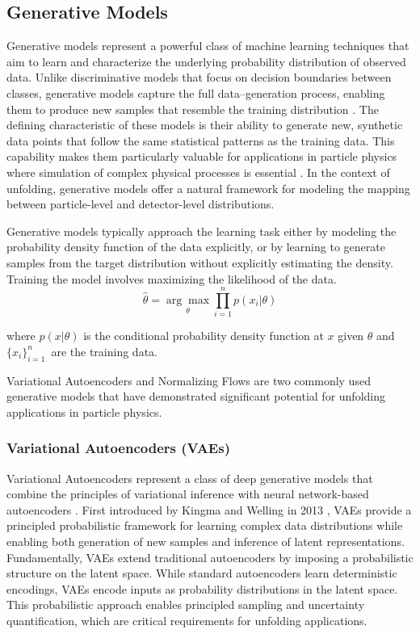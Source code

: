 \subsection{Generative Models}
    Generative models represent a powerful class of machine learning techniques that aim to learn and characterize the underlying probability distribution of observed data.
    Unlike discriminative models that focus on decision boundaries between classes, generative models capture the full data--generation process, enabling them to produce new samples that resemble the training distribution .
    The defining characteristic of these models is their ability to generate new, synthetic data points that follow the same statistical patterns as the training data.
    This capability makes them particularly valuable for applications in particle physics where simulation of complex physical processes is essential .
    In the context of unfolding, generative models offer a natural framework for modeling the mapping between particle-level and detector-level distributions.
    
    Generative models typically approach the learning task either by modeling the probability density function of the data explicitly, or by learning to generate samples from the target distribution without explicitly estimating the density.
    Training the model involves maximizing the likelihood of the data.
    \begin{equation}
        \hat{\theta} = \underset{\theta}{\arg\max} \prod_{i=1}^{n} p(x_i | \theta)
    \end{equation}
    
    where \(p(x | \theta)\) is the conditional probability density function at \(x\) given \(\theta\) and \(\{x_i\}_{i=1}^{n}\)\ are the training data.
    
    Variational Autoencoders and Normalizing Flows are two commonly used generative models that have demonstrated significant potential for unfolding applications in particle physics.

    \subsubsection{Variational Autoencoders (VAEs)}
        Variational Autoencoders represent a class of deep generative models that combine the principles of variational inference with neural network-based autoencoders .
        First introduced by Kingma and Welling in 2013 , VAEs provide a principled probabilistic framework for learning complex data distributions while enabling both generation of new samples and inference of latent representations.
        Fundamentally, VAEs extend traditional autoencoders by imposing a probabilistic structure on the latent space.
        While standard autoencoders learn deterministic encodings, VAEs encode inputs as probability distributions in the latent space.
        This probabilistic approach enables principled sampling and uncertainty quantification, which are critical requirements for unfolding applications.

